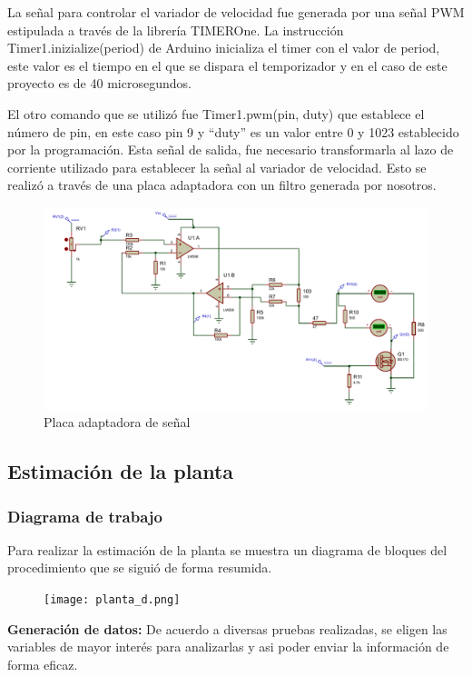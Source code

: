 La señal para controlar el variador de velocidad fue generada por una señal PWM estipulada a través de la librería TIMEROne. La instrucción Timer1.inizialize(period)
 de Arduino inicializa el timer con el valor de period, este valor es el tiempo en el que se dispara el temporizador y en el caso de este proyecto es de 40 microsegundos.
 
El otro comando que se utilizó fue Timer1.pwm(pin, duty) que establece el número de pin, en este caso pin 9 y “duty” es un valor entre 0 y 1023 establecido por la programación. 
Esta señal de salida, fue necesario transformarla al lazo de corriente utilizado para establecer la señal al variador de velocidad. Esto se realizó a través de una placa adaptadora con un filtro generada por nosotros.
\begin{figure}[htbp]
	\centering
	\includegraphics[width=0.8\linewidth]{imagenes/plano_DC.pdf}
	\caption{Placa adaptadora de señal}
	\label{fig:adapt}
\end{figure}



\subsection{Estimación de la planta} \label{sec:estima}
    \subsubsection{Diagrama de trabajo}

Para realizar la estimación de la planta se muestra un diagrama de bloques del procedimiento que se siguió de forma resumida.

\begin{figure}[htb]
	\centering
	\texttt{[image: planta\_d.png]}
	\label{fig:planta_d}
\end{figure}

 \textbf{Generación de datos:} De acuerdo a diversas pruebas realizadas, se eligen las variables de mayor interés para analizarlas y asi poder enviar la información de forma eficaz.

